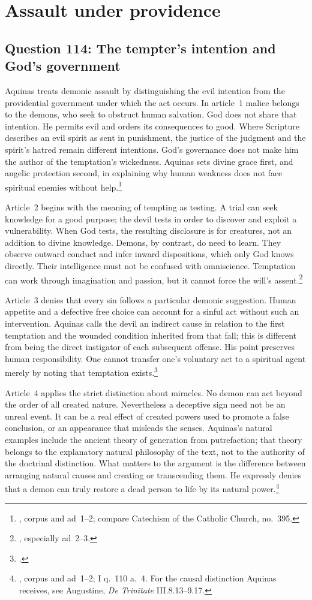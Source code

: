 \section{Assault under providence}
\subsection{Question 114: The tempter's intention and God's government}\label{q114}
Aquinas treats demonic assault by distinguishing the evil intention from the providential government under which the act occurs. In article~1 malice belongs to the demons, who seek to obstruct human salvation. God does not share that intention. He permits evil and orders its consequences to good. Where Scripture describes an evil spirit as sent in punishment, the justice of the judgment and the spirit's hatred remain different intentions. God's governance does not make him the author of the temptation's wickedness. Aquinas sets divine grace first, and angelic protection second, in explaining why human weakness does not face spiritual enemies without help.\footnote{, corpus and ad~1--2; compare Catechism of the Catholic Church, no.~395.}

Article~2 begins with the meaning of tempting as testing. A trial can seek knowledge for a good purpose; the devil tests in order to discover and exploit a vulnerability. When God tests, the resulting disclosure is for creatures, not an addition to divine knowledge. Demons, by contrast, do need to learn. They observe outward conduct and infer inward dispositions, which only God knows directly. Their intelligence must not be confused with omniscience. Temptation can work through imagination and passion, but it cannot force the will's assent.\footnote{, especially ad~2--3.}

Article~3 denies that every sin follows a particular demonic suggestion. Human appetite and a defective free choice can account for a sinful act without such an intervention. Aquinas calls the devil an indirect cause in relation to the first temptation and the wounded condition inherited from that fall; this is different from being the direct instigator of each subsequent offense. His point preserves human responsibility. One cannot transfer one's voluntary act to a spiritual agent merely by noting that temptation exists.\footnote{.}

Article~4 applies the strict distinction about miracles. No demon can act beyond the order of all created nature. Nevertheless a deceptive sign need not be an unreal event. It can be a real effect of created powers used to promote a false conclusion, or an appearance that misleads the senses. Aquinas's natural examples include the ancient theory of generation from putrefaction; that theory belongs to the explanatory natural philosophy of the text, not to the authority of the doctrinal distinction. What matters to the argument is the difference between arranging natural causes and creating or transcending them. He expressly denies that a demon can truly restore a dead person to life by its natural power.\footnote{, corpus and ad~1--2; I q.~110 a.~4. For the causal distinction Aquinas receives, see Augustine, \emph{De Trinitate} III.8.13--9.17.}


